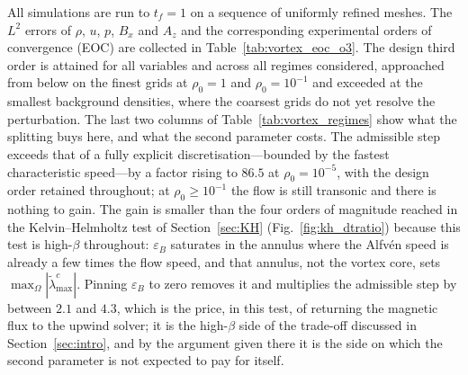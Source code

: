 \documentclass[a4paper,fleqn]{cas-sc}
\theoremstyle{remark}
\newcommand{\eps}{\varepsilon}
\newcommand{\epsB}{\eps_{B}}
\begin{document}
All simulations are run to $t_f=1$ on a sequence of uniformly refined meshes.
The $L^2$ errors of $\rho$, $u$, $p$, $B_x$ and $A_z$ and the corresponding
experimental orders of convergence (EOC) are collected in
Table~\ref{tab:vortex_eoc_o3}. The design third order is attained for all
variables and across all regimes considered, approached from below on the
finest grids at $\rho_0=1$ and $\rho_0=10^{-1}$ and exceeded at the smallest
background densities, where the coarsest grids do not yet resolve the
perturbation. The last two columns of Table~\ref{tab:vortex_regimes} show what the splitting
buys here, and what the second parameter costs. The admissible step exceeds
that of a fully explicit discretisation---bounded by the fastest characteristic
speed---by a factor rising to $86.5$ at $\rho_0=10^{-5}$, with the design order
retained throughout; at $\rho_0\ge10^{-1}$ the flow is still transonic and
there is nothing to gain. The gain is smaller than the four orders of magnitude
reached in the Kelvin--Helmholtz test of Section~\ref{sec:KH}
(Fig.~\ref{fig:kh_dtratio}) because this test is high-$\beta$ throughout:
$\epsB$ saturates in the annulus where the Alfv\'en speed is already a few
times the flow speed, and that annulus, not the vortex core, sets
$\max_\Omega|\tilde\lambda^{c}_{\max}|$. Pinning $\epsB$ to zero removes it and
multiplies the admissible step by between $2.1$ and $4.3$, which is the price,
in this test, of returning the magnetic flux to the upwind solver; it is the
high-$\beta$ side of the trade-off discussed in Section~\ref{sec:intro}, and by
the argument given there it is the side on which the second parameter is not
expected to pay for itself.
\end{document}

